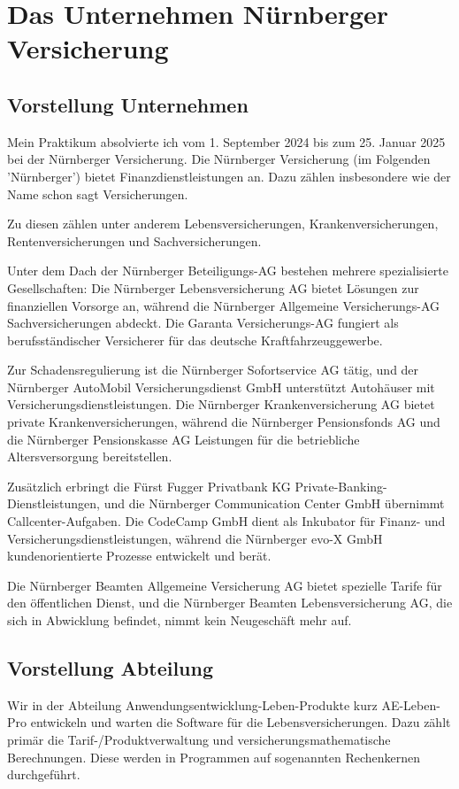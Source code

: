 \chapter{Das Unternehmen Nürnberger Versicherung}\label{ch:intro}


\section{Vorstellung Unternehmen}
Mein Praktikum absolvierte ich vom 1. September 2024 bis zum 25. Januar 2025 bei der Nürnberger Versicherung.
Die Nürnberger Versicherung (im Folgenden 'Nürnberger') bietet Finanzdienstleistungen an.
Dazu zählen insbesondere wie der Name schon sagt Versicherungen.


Zu diesen zählen unter anderem Lebensversicherungen, Krankenversicherungen, Rentenversicherungen und Sachversicherungen.

Unter dem Dach der Nürnberger Beteiligungs-AG bestehen mehrere spezialisierte Gesellschaften: Die Nürnberger Lebensversicherung AG bietet Lösungen zur finanziellen Vorsorge an, während die Nürnberger Allgemeine Versicherungs-AG Sachversicherungen abdeckt. Die Garanta Versicherungs-AG fungiert als berufsständischer Versicherer für das deutsche Kraftfahrzeuggewerbe.

Zur Schadensregulierung ist die Nürnberger Sofortservice AG tätig, und der Nürnberger AutoMobil Versicherungsdienst GmbH unterstützt Autohäuser mit Versicherungsdienstleistungen. Die Nürnberger Krankenversicherung AG bietet private Krankenversicherungen, während die Nürnberger Pensionsfonds AG und die Nürnberger Pensionskasse AG Leistungen für die betriebliche Altersversorgung bereitstellen.

Zusätzlich erbringt die Fürst Fugger Privatbank KG Private-Banking-Dienstleistungen, und die Nürnberger Communication Center GmbH übernimmt Callcenter-Aufgaben. Die CodeCamp GmbH dient als Inkubator für Finanz- und Versicherungsdienstleistungen, während die Nürnberger evo-X GmbH kundenorientierte Prozesse entwickelt und berät.

Die Nürnberger Beamten Allgemeine Versicherung AG bietet spezielle Tarife für den öffentlichen Dienst, und die Nürnberger Beamten Lebensversicherung AG, die sich in Abwicklung befindet, nimmt kein Neugeschäft mehr auf.\cite{NürnbergerWiki2024}
\section{Vorstellung Abteilung}
Wir in der Abteilung Anwendungsentwicklung-Leben-Produkte kurz AE-Leben-Pro entwickeln und warten die Software für die Lebensversicherungen.
Dazu zählt primär die Tarif-/Produktverwaltung und versicherungsmathematische Berechnungen. 
Diese werden in Programmen auf sogenannten Rechenkernen durchgeführt.

